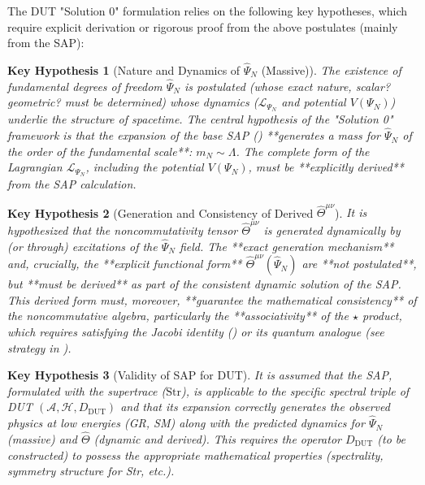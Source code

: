 \documentclass[11pt, a4paper]{article}
\newtheorem{hypothesis}{Key Hypothesis}[section]
\theoremstyle{remark}
\newcommand{\Op}[1]{\hat{#1}}
\newcommand{\Str}{\mathrm{Str}}
\begin{document}
The DUT "Solution 0" formulation relies on the following key hypotheses, which require explicit derivation or rigorous proof from the above postulates (mainly from the SAP):

\begin{hypothesis}[Nature and Dynamics of \texorpdfstring{$\Op{\Psi}_N$}{PsiN} (Massive)]
    \label{hyp:psi_n_final}
    The existence of fundamental degrees of freedom \( \Op{\Psi}_N \) is postulated (whose exact nature, scalar? geometric? must be determined) whose dynamics (\(\mathcal{L}_{\Psi_N}\) and potential \(V(\Psi_N)\)) underlie the structure of spacetime. The central hypothesis of the "Solution 0" framework is that the expansion of the base SAP () **generates a mass for \( \Op{\Psi}_N \) of the order of the fundamental scale**: \( m_N \sim \Lambda \). The complete form of the Lagrangian \( \mathcal{L}_{\Psi_N} \), including the potential \(V(\Psi_N)\), must be **explicitly derived** from the SAP calculation.
\end{hypothesis}

\begin{hypothesis}[Generation and Consistency of Derived \texorpdfstring{$\Op{\Theta}^{\mu\nu}$}{Theta}]
    \label{hyp:theta_gen_final}
    It is hypothesized that the noncommutativity tensor \( \Op{\Theta}^{\mu\nu} \) is generated dynamically by (or through) excitations of the \( \Op{\Psi}_N \) field. The **exact generation mechanism** and, crucially, the **explicit functional form** \( \Op{\Theta}^{\mu\nu}(\Op{\Psi}_N) \) are **not postulated**, but **must be derived** as part of the consistent dynamic solution of the SAP. This derived form must, moreover, **guarantee the mathematical consistency** of the noncommutative algebra, particularly the **associativity** of the \( \star \) product, which requires satisfying the Jacobi identity () or its quantum analogue (see strategy in ).
\end{hypothesis}

\begin{hypothesis}[Validity of SAP for DUT]
    \label{hyp:pae_validity_final}
    It is assumed that the SAP, formulated with the supertrace (\( \Str \)), is applicable to the specific spectral triple of DUT \((\mathcal{A}, \mathcal{H}, D_{\text{DUT}})\) and that its expansion correctly generates the observed physics at low energies (GR, SM) along with the predicted dynamics for \( \Op{\Psi}_N \) (massive) and \( \Op{\Theta} \) (dynamic and derived). This requires the operator \( D_{\text{DUT}} \) (to be constructed) to possess the appropriate mathematical properties (spectrality, symmetry structure for Str, etc.).
\end{hypothesis}
\end{document}
